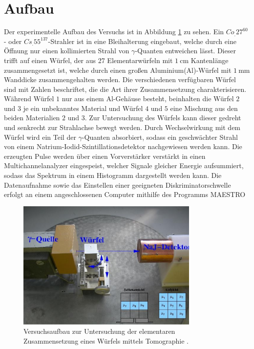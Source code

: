 \section{Aufbau}
\label{sec:Aufbau}

Der experimentelle Aufbau des Versuchs ist in Abbildung \ref{fig:aufbau} zu sehen.
Ein $Co_.{27}^\text{60}$- oder $Cs_.{55}^\text{137}$-Strahler ist in eine Bleihalterung eingebaut, welche durch eine Öffnung nur einen kollimierten Strahl von $\gamma$-Quanten entweichen lässt. Dieser trifft auf einen Würfel, der aus 27 Elementarwürfeln mit $\SI{1}{\centi\meter}$ Kantenlänge zusammengesetzt ist, welche durch einen großen Aluminium(Al)-Würfel mit $\SI{1}{\milli\meter}$ Wanddicke zusammengehalten werden.
Die verschiedenen verfügbaren Würfel sind mit Zahlen beschriftet, die die Art ihrer Zusammensetzung charakterisieren. Während Würfel $1$ nur aus einem Al-Gehäuse besteht, beinhalten die Würfel $2$ und $3$ je ein unbekanntes Material und Würfel $4$ und $5$ eine Mischung aus den beiden Materialien $2$ und $3$.
Zur Untersuchung des Würfels kann dieser gedreht und senkrecht zur Strahlachse bewegt werden.
Durch Wechselwirkung mit dem Würfel wird ein Teil der $\gamma$-Quanten absorbiert, sodass ein geschwächter Strahl von einem Natrium-Iodid-Szintillationsdetektor nachgewiesen werden kann. Die erzeugten Pulse werden über einen Vorverstärker verstärkt in einen Multichannelanalyzer eingespeist, welcher Signale gleicher Energie aufsummiert, sodass das Spektrum in einem Histogramm dargestellt werden kann.
Die Datenaufnahme sowie das Einstellen einer geeigneten Diskriminatorschwelle erfolgt an einem angeschlossenen Computer mithilfe des Programms MAESTRO
\begin{figure}
\centering
\includegraphics[keepaspectratio,width=0.8\textwidth]{content/images/aufbau.png}
\caption{Versuchsaufbau zur Untersuchung der elementaren Zusammensetzung eines Würfels mittels Tomographie \cite{V14}.}
\label{fig:aufbau}
\end{figure}